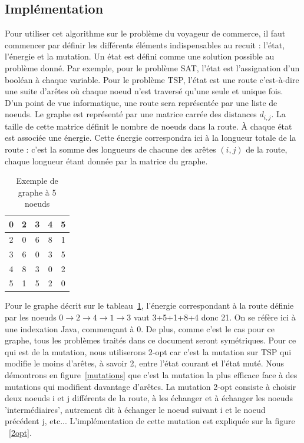 \documentclass{article}%
\begin{document}
\subsection{Implémentation}

\vspace{1cm}

	Pour utiliser cet algorithme sur le problème du voyageur de commerce, il faut commencer par définir les différents éléments indispensables au recuit : l'état, l'énergie et la mutation.
	Un état est défini comme une solution possible au problème donné. Par exemple, pour le problème SAT, l'état est l'assignation d'un booléan à chaque variable. Pour le problème TSP, l'état est une route c'est-à-dire une suite d'arêtes où chaque noeud n'est traversé qu'une seule et unique fois. D'un point de vue informatique, une route sera représentée par une liste de noeuds. Le graphe est représenté par une matrice carrée des distances $ d_{i,j} $. La taille de cette matrice définit le nombre de noeuds dans la route. À chaque état est associée une énergie. Cette énergie correspondra ici à la longueur totale de la route : c'est la somme des longueurs de chacune des arêtes $ (i,j) $ de la route, chaque longueur étant donnée par la matrice du graphe.
	
	
	\begin{table}[hp]
		\centering
			\begin{tabular}{|*{5}{c|}}
					\hline
					0  & 2  & 3 & 4 & 5 \\
					\hline
					2  & 0 & 6 & 8 & 1 \\
					\hline
					3  & 6 & 0 & 3 & 5 \\
					\hline
					4  & 8 & 3 & 0 & 2 \\
					\hline
					5  & 1 & 5 & 2 & 0 \\
					\hline
			\end{tabular}
		\label{tableau_distances}
		\caption{Exemple de graphe à 5 noeuds}
	\end{table}

		Pour le graphe décrit sur le tableau~\ref{tableau_distances}, l'énergie correspondant à la route définie par les noeuds $ 0\rightarrow 2\rightarrow 4\rightarrow 1\rightarrow 3 $ vaut 3+5+1+8+4 donc 21. On se réfère ici à une indexation Java, commençant à 0. De plus, comme c'est le cas pour ce graphe, tous les problèmes traités dans ce document seront symétriques.
		Pour ce qui est de la mutation, nous utiliserons 2-opt car c'est la mutation sur TSP qui modifie le moins d'arêtes, à savoir 2, entre l'état courant et l'état muté. Nous démontrons en figure~\ref{mutations} que c'est la mutation la plus efficace face à des mutations qui modifient davantage d'arêtes.
		La mutation 2-opt consiste à choisir deux noeuds i et j différents de la route, à les échanger et à échanger les noeuds 'intermédiaires', autrement dit à échanger le noeud suivant i et le noeud précédent j, etc... L'implémentation de cette mutation est expliquée sur la figure ~\ref{2opt}.
	
\end{document}
